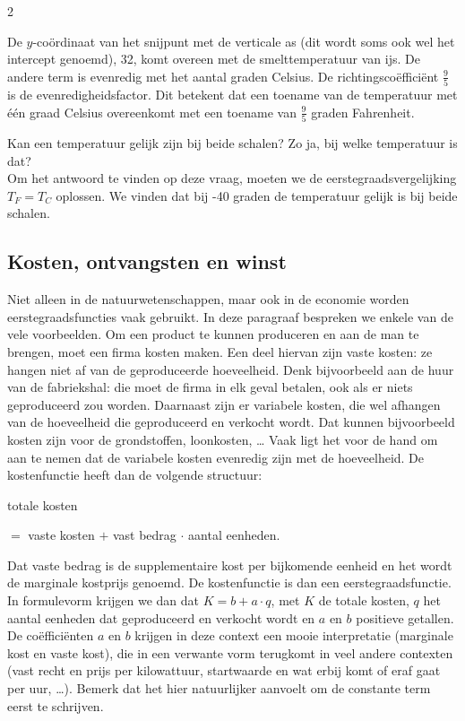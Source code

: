 \begin{multicols}{2}

De $y$-coördinaat van het snijpunt met de verticale as (dit wordt soms ook wel het intercept genoemd), 32, komt overeen met de smelttemperatuur van ijs. De andere term is evenredig met het aantal graden Celsius. De richtingscoëfficiënt $\frac{9}{5}$ is de evenredigheidsfactor. Dit betekent dat een toename van de temperatuur met één graad Celsius overeenkomt met een toename van $\frac{9}{5}$ graden Fahrenheit.

Kan een temperatuur gelijk zijn bij beide schalen? Zo ja, bij welke temperatuur is dat?\\

Om het antwoord te vinden op deze vraag, moeten we de eerstegraadsvergelijking $T_F=T_C$ oplossen. We vinden dat bij -40 graden de temperatuur gelijk is bij beide schalen.

\subsection{Kosten, ontvangsten en winst}

Niet alleen in de natuurwetenschappen, maar ook in de economie worden eerstegraadsfuncties vaak gebruikt. In deze paragraaf bespreken we enkele van de vele voorbeelden. Om een product te kunnen produceren en aan de man te brengen, moet een firma kosten maken. Een deel hiervan zijn vaste kosten: ze hangen niet af van de geproduceerde hoeveelheid. Denk bijvoorbeeld aan de huur van de fabriekshal: die moet de firma in elk geval betalen, ook als er niets geproduceerd zou worden. Daarnaast zijn er variabele kosten, die wel afhangen van de hoeveelheid die geproduceerd en verkocht wordt. Dat kunnen bijvoorbeeld kosten zijn voor de grondstoffen, loonkosten, … Vaak ligt het voor de hand om aan te nemen dat de variabele kosten evenredig zijn met de hoeveelheid. De kostenfunctie heeft dan de volgende structuur:

totale kosten

$=$ vaste kosten $+$ vast bedrag $\cdot$ aantal eenheden.

Dat vaste bedrag is de supplementaire kost per bijkomende eenheid en het wordt de marginale kostprijs genoemd. De kostenfunctie is dan een eerstegraadsfunctie. In formulevorm krijgen we dan dat $K=b+a\cdot q$, met $K$ de totale kosten, $q$ het aantal eenheden dat geproduceerd en verkocht wordt en $a$ en $b$ positieve getallen. De coëffi\-ciënten $a$ en $b$ krijgen in deze context een mooie interpretatie (marginale kost en vaste kost), die in een verwante vorm terugkomt in veel andere contexten (vast recht en prijs per kilowattuur, startwaarde en wat erbij komt of eraf gaat per uur, …). Bemerk dat het hier natuurlijker aanvoelt om de constante term eerst te schrijven.


\end{multicols}
